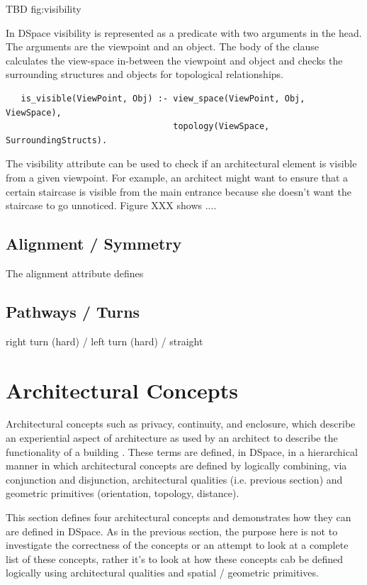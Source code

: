 \documentclass[12pt]{ucthesis}
\begin{document}
TBD fig:visibility

In DSpace visibility is represented as a predicate with two arguments in the head. The arguments are the viewpoint and an object. The body of the clause calculates the view-space in-between the viewpoint and object and checks the surrounding structures and objects for topological relationships.

\begin{verbatim}
   is_visible(ViewPoint, Obj) :- view_space(ViewPoint, Obj, ViewSpace),
                                 topology(ViewSpace, SurroundingStructs).
\end{verbatim}

The visibility attribute can be used to check if an architectural element is visible from a given viewpoint. For example, an architect might want to ensure that a certain staircase is visible from the main entrance because she doesn't want the staircase to go unnoticed. Figure XXX shows ....  


\subsection{Alignment / Symmetry}
The alignment attribute defines 

\subsection{Pathways / Turns}  right turn (hard) / left turn (hard) / straight 


\section{Architectural Concepts}
Architectural concepts such as privacy, continuity, and enclosure, which describe an experiential aspect of architecture as used by an architect to describe the functionality of a building \cite{Koile}. These terms are defined, in DSpace, in a hierarchical manner in which architectural concepts are defined by logically combining, via conjunction and disjunction, architectural qualities (i.e. previous section) and geometric primitives (orientation, topology, distance). 

This section defines four architectural concepts and demonstrates how they can are defined in DSpace. As in the previous section, the purpose here is not to investigate the correctness of the concepts or an attempt to look at a complete list of these concepts, rather it's to look at how these concepts cab be defined logically using architectural qualities and spatial / geometric primitives.
\end{document}
